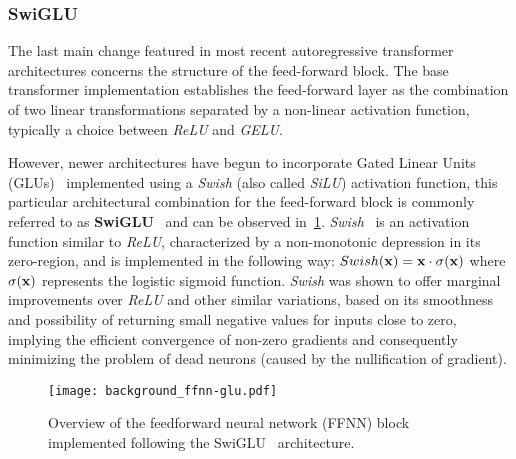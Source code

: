 \subsubsection*{SwiGLU}

The last main change featured in most recent autoregressive transformer architectures concerns the structure of the feed-forward block.
The base transformer implementation establishes the feed-forward layer as the combination of two linear transformations separated by a non-linear activation function, typically a choice between \emph{ReLU} and \emph{GELU}.

However, newer architectures have begun to incorporate Gated Linear Units (GLUs)~\cite{dauphin2017} implemented using a \emph{Swish} (also called \emph{SiLU}) activation function, this particular architectural combination for the feed-forward block is commonly referred to as \textbf{SwiGLU}~\cite{shazeer2020} and can be observed in~\cref{fig:background_ffnn-glu}.
\emph{Swish}~\cite{shazeer2020} is an activation function similar to \emph{ReLU}, characterized by a non-monotonic depression in its zero-region, and is implemented in the following way: $Swish(\bm{\mathbf{x}}) = \bm{\mathbf{x}} \cdot \sigma(\bm{\mathbf{x}})$ where $\sigma(\bm{\mathbf{x}})$ represents the logistic sigmoid function.
\emph{Swish} was shown to offer marginal improvements over \emph{ReLU} and other similar variations, based on its smoothness and possibility of returning small negative values for inputs close to zero, implying the efficient convergence of non-zero gradients and consequently minimizing the problem of dead neurons (caused by the nullification of gradient).

\begin{figure}[t!]
    \centering
    \texttt{[image: background\_ffnn-glu.pdf]}
    \caption{Overview of the feedforward neural network (FFNN) block implemented following the SwiGLU~\cite{shazeer2020} architecture.}
    \label{fig:background_ffnn-glu}
\end{figure}


